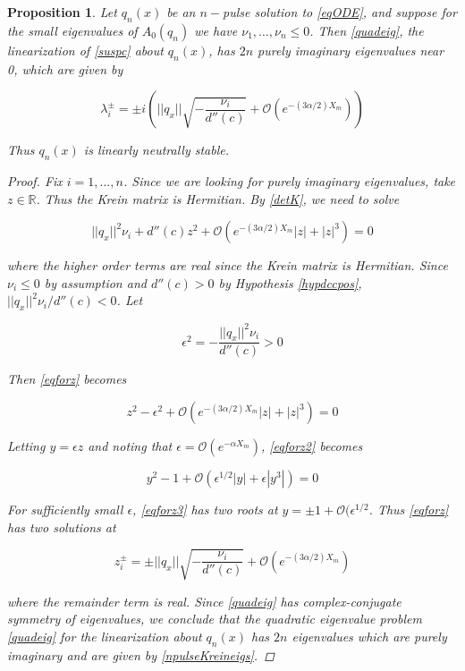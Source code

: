 \documentclass[12pt]{article}
\def\R{{\mathbb R}}
\newtheorem{proposition}{Proposition}
\begin{document}
\begin{proposition}\label{stabcrit}
Let $q_n(x)$ be an $n-$pulse solution to \eqref{eqODE}, and suppose for the small eigenvalues of $A_0(q_n)$ we have $\nu_1, \dots, \nu_n \leq 0$. Then \eqref{quadeig}, the linearization of \eqref{suspc} about $q_n(x)$, has $2n$ purely imaginary eigenvalues near 0, which are given by

\begin{equation}\label{npulseKreineigs}
\lambda_i^\pm = \pm i \left( ||q_x|| \sqrt{ -\frac{ \nu_i}{d''(c)} } + \mathcal{O}(e^{-(3 \alpha/2) X_m}) \right)
\end{equation}

Thus $q_n(x)$ is linearly neutrally stable.

\begin{proof}
Fix $i = 1, \dots, n$. Since we are looking for purely imaginary eigenvalues, take $z \in \R$. Thus the Krein matrix is Hermitian. By \eqref{detK}, we need to solve

\begin{equation}\label{eqforz}
||q_x||^2 \nu_i + d''(c) z^2 + \mathcal{O}(e^{-(3 \alpha/2) X_m}|z| + |z|^3) = 0
\end{equation}

where the higher order terms are real since the Krein matrix is Hermitian. Since $\nu_i \leq 0$ by assumption and $d''(c) > 0$ by Hypothesis \ref{hypdccpos}, $||q_x||^2 \nu_i / d''(c) < 0$. Let

\begin{equation}\label{epsilon2}
\epsilon^2 = -\frac{||q_x||^2 \nu_i}{d''(c)} > 0
\end{equation}

Then \eqref{eqforz} becomes

\begin{equation}\label{eqforz2}
z^2 - \epsilon^2 + \mathcal{O}(e^{-(3 \alpha/2) X_m}|z| + |z|^3) = 0
\end{equation}

Letting $y = \epsilon z$ and noting that $\epsilon = \mathcal{O}(e^{-\alpha X_m})$, \eqref{eqforz2} becomes

\begin{equation}\label{eqforz3}
y^2 - 1 + \mathcal{O}(\epsilon^{1/2 }|y| + \epsilon|y^3|) = 0
\end{equation}

For sufficiently small $\epsilon$, \eqref{eqforz3} has two roots at $y = \pm 1 + \mathcal{O}(\epsilon^{1/2}$. Thus \eqref{eqforz} has two solutions at

\begin{equation}
z_i^\pm = \pm ||q_x|| \sqrt{ -\frac{ \nu_i}{d''(c)} } + \mathcal{O}(e^{-(3 \alpha/2) X_m})
\end{equation}

where the remainder term is real. Since \eqref{quadeig} has complex-conjugate symmetry of eigenvalues, we conclude that the quadratic eigenvalue problem \eqref{quadeig} for the linearization about $q_n(x)$ has $2n$ eigenvalues which are purely imaginary and are given by \eqref{npulseKreineigs}.

\end{proof}
\end{proposition}
\end{document}
